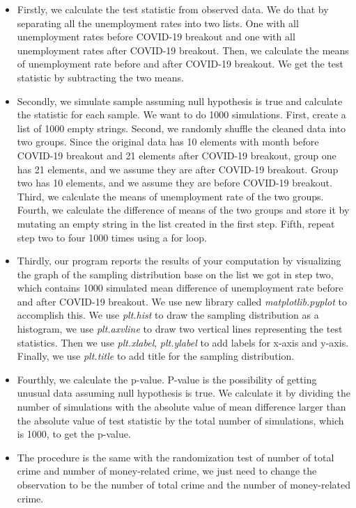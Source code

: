 \documentclass[fontsize=11pt]{article}
\begin{document}
\begin{itemize}
    \item Firstly, we calculate the test statistic from observed data. We do that by separating all the unemployment rates into two lists. One with all unemployment rates before COVID-19 breakout and one with all unemployment rates after COVID-19 breakout. Then, we calculate the means of unemployment rate before and after COVID-19 breakout. We get the test statistic by subtracting the two means.
    \item Secondly, we simulate sample assuming null hypothesis is true and calculate the statistic for each sample. We want to do 1000 simulations. First, create a list of 1000 empty strings. Second, we randomly shuffle the cleaned data into two groups. Since the original data has 10 elements with month before COVID-19 breakout and 21 elements after COVID-19 breakout, group one has 21 elements, and we assume they are after COVID-19 breakout. Group two has 10 elements, and we assume they are before COVID-19 breakout. Third, we calculate the means of unemployment rate of the two groups. Fourth, we calculate the difference of means of the two groups and store it by mutating an empty string in the list created in the first step. Fifth, repeat step two to four 1000 times using a for loop.
    \item Thirdly, our program reports the results of your computation by visualizing the graph of the sampling distribution base on the list we got in step two, which contains 1000 simulated mean difference of unemployment rate before and after COVID-19 breakout. We use new library called \textsl{matplotlib.pyplot} to accomplish this. We use \textit{plt.hist} to draw the sampling distribution as a histogram, we use \textit{plt.axvline} to draw two vertical lines representing the test statistics. Then we use \textit{plt.xlabel}, \textit{plt.ylabel} to add labels for x-axis and y-axis. Finally, we use \textit{plt.title} to add title for the sampling distribution.
    \item Fourthly, we calculate the p-value. P-value is the possibility of getting unusual data assuming null hypothesis is true. We calculate it by dividing the number of simulations with the absolute value of mean difference larger than the absolute value of test statistic by the total number of simulations, which is 1000, to get the p-value.
    \item The procedure is the same with the randomization test of number of total crime and number of money-related crime, we just need to change the observation to be the number of total crime and the number of money-related crime.
\end{itemize}
\end{document}
